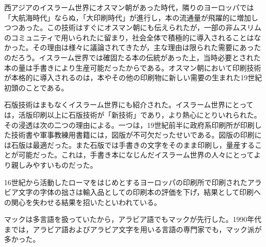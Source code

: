 西アジアのイスラーム世界にオスマン朝があった時代，隣りのヨーロッパでは「大航海時代」ならぬ，「大印刷時代」が進行し，本の流通量が飛躍的に増加しつつあった。この技術はすぐにオスマン朝にも伝えられたが，一部の非ムスリムのコミュニティで用いられたに留まり，社会全体で積極的に導入されることはなかった。その理由は様々に議論されてきたが，主な理由は限られた需要にあったのだろう。イスラーム世界では確固たる本の伝統があった上，当時必要とされた本の量は手書きにより生産可能だったからである。オスマン朝において印刷技術が本格的に導入されるのは，本やその他の印刷物に新しい需要の生まれた19世紀初頭のことである\cite{history_of_islamic_books}。

石版技術はまもなくイスラーム世界にも紹介された。イスラーム世界にとっては，活版印刷以上に石版技術が「新技術」であり，より熱心にとりいれられた。その浸透は次の二つの理由による。一つは，19世紀前半に政府系印刷所が印刷した技術書や軍事教練用書籍には，図版が不可欠だったせいである。図版の印刷には石版は最適だった。また石版では手書きの文字をそのまま印刷し，量産することが可能だった。これは，手書き本になじんだイスラーム世界の人々にとってより親しみやすいものだった\cite{history_of_islamic_books}。

16世紀から活動したローマをはじめとするヨーロッパの印刷所で印刷されたアラビア文字の字体の拙さは輸入品としての印刷本の評価を下げ，結果として印刷への関心を失わせる結果を招いたといわれている\cite{history_of_islamic_books}。

マックは多言語を扱っていたから，アラビア語でもマックが先行した。1990年代までは，アラビア語およびアラビア文字を用いる言語の専門家でも，マック派が多かった\cite{history_of_islamic_books}。
